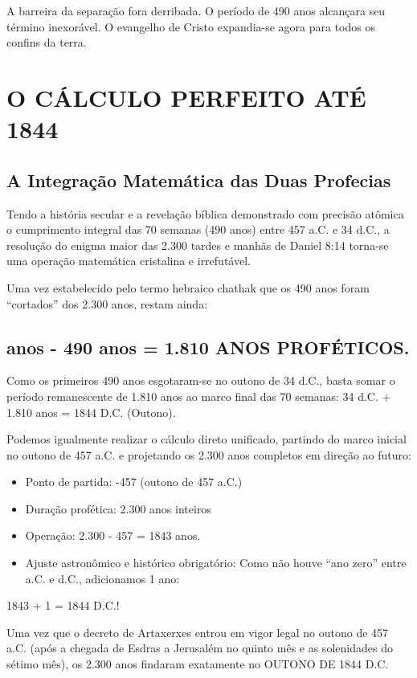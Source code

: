 A barreira da separação fora derribada. O período de 490 anos alcançara seu término inexorável. O evangelho de Cristo expandia-se agora para todos os confins da terra.



\section{O CÁLCULO PERFEITO ATÉ 1844}



\subsection{A Integração Matemática das Duas Profecias}


Tendo a história secular e a revelação bíblica demonstrado com precisão atômica o cumprimento integral das 70 semanas (490 anos) entre 457 a.C. e 34 d.C., a resolução do enigma maior das 2.300 tardes e manhãs de Daniel 8:14 torna-se uma operação matemática cristalina e irrefutável.

Uma vez estabelecido pelo termo hebraico chathak que os 490 anos foram ``cortados'' dos 2.300 anos, restam ainda:

\subsection{anos - 490 anos = 1.810 ANOS PROFÉTICOS.}


Como os primeiros 490 anos esgotaram-se no outono de 34 d.C., basta somar o período remanescente de 1.810 anos ao marco final das 70 semanas:
34 d.C. + 1.810 anos = 1844 D.C. (Outono).

Podemos igualmente realizar o cálculo direto unificado, partindo do marco inicial no outono de 457 a.C. e projetando os 2.300 anos completos em direção ao futuro:
\begin{itemize}
  \item Ponto de partida: -457 (outono de 457 a.C.)
  \item Duração profética: 2.300 anos inteiros
  \item Operação: 2.300 - 457 = 1843 anos.
  \item Ajuste astronômico e histórico obrigatório: Como não houve ``ano zero'' entre a.C. e d.C., adicionamos 1 ano:
\end{itemize}

1843 + 1 = 1844 D.C.!

Uma vez que o decreto de Artaxerxes entrou em vigor legal no outono de 457 a.C. (após a chegada de Esdras a Jerusalém no quinto mês e as solenidades do sétimo mês), os 2.300 anos findaram exatamente no OUTONO DE 1844 D.C.



